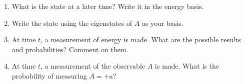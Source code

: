 \documentclass[10pt, letterpaper, twoside, openany]{article}
\begin{document}
\begin{enumerate}
\vspace{2in}

\item What is the state at a later time?  Write it in the energy basis.

\vspace{1in}

\item Write the state using the eigenstates of $A$ as your basis.

\newpage

\item At time $t$, a measurement of energy is made.  What are the possible results and probabilities?  Comment on them.

\vspace{1in}

\item At time $t$, a measurement of the observable $A$ is made.  What is the probability of measuring $A = +a$?  

\end{enumerate}
\end{document}
